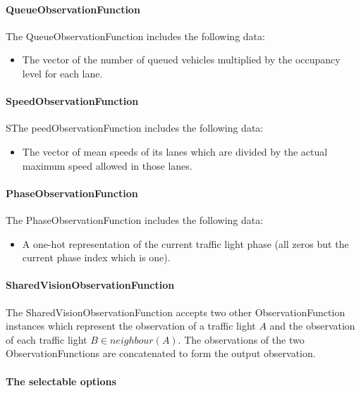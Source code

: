 \paragraph{QueueObservationFunction}

The QueueObservationFunction includes the following data:
\begin{itemize}
  \item The vector of the number of queued vehicles multiplied by the occupancy level for each lane.
\end{itemize}

\paragraph{SpeedObservationFunction}

SThe peedObservationFunction includes the following data:
\begin{itemize}
  \item The vector of mean speeds of its lanes which are divided by the actual maximum speed allowed in those lanes.
\end{itemize}

\paragraph{PhaseObservationFunction}

The PhaseObservationFunction includes the following data:
\begin{itemize}
  \item A one-hot representation of the current traffic light phase (all zeros but the current phase index which is one).
\end{itemize}

\paragraph{SharedVisionObservationFunction}

The SharedVisionObservationFunction accepts two other ObservationFunction instances which represent the observation of a traffic light $A$ and the observation of each traffic light $B \in neighbour(A)$.
The observations of the two ObservationFunctions are concatenated to form the output observation.

\paragraph{The selectable options}

